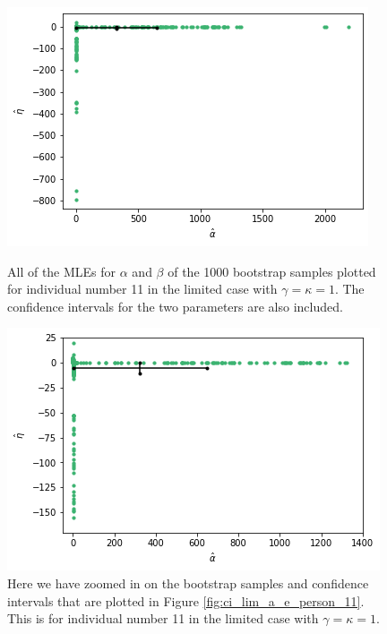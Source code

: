 \begin{figure}
    \centering
    \begin{minipage}{0.48\textwidth}
        \centering
        \includegraphics[scale=0.37]{pictures/ci_lim_a_e_person11.png}
        \caption[MLEs for $\alpha$ and $\beta$ for bootstrap samples individual 11, limited]{All of the MLEs for $\alpha$ and $\beta$ of the 1000 bootstrap samples plotted for individual number 11 in the limited case with $\gamma=\kappa=1$. The confidence intervals for the two parameters are also included.}
        \label{fig:ci_lim_a_e_person_11}
    \end{minipage}\hfill
    \begin{minipage}{0.48\textwidth}
        \centering
        \includegraphics[scale=0.37]{pictures/ci_lim_a_e_person11_zoomed.png}
        \caption[MLEs for $\alpha$ and $\beta$ of bootstrap samples individual 11, unlimited, zoomed]{Here we have zoomed in on the bootstrap samples and confidence intervals that are plotted in Figure \ref{fig:ci_lim_a_e_person_11}. This is for individual number 11 in the limited case with $\gamma=\kappa=1$.}
        \label{fig:ci_lim_a_e_person_11_zoomed}
    \end{minipage}
\end{figure}

